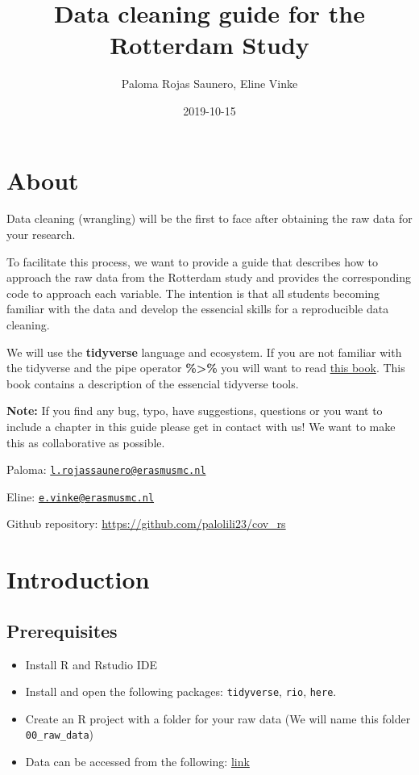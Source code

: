 \documentclass[]{book}
\title{Data cleaning guide for the Rotterdam Study}
\author{Paloma Rojas Saunero, Eline Vinke}
\date{2019-10-15}
\begin{document}
\maketitle

{
\setcounter{tocdepth}{1}
\tableofcontents
}
\hypertarget{about}{%
\chapter{About}\label{about}}

Data cleaning (wrangling) will be the first to face after obtaining the raw data for your research.

To facilitate this process, we want to provide a guide that describes how to approach the raw data from the Rotterdam study and provides the corresponding code to approach each variable. The intention is that all students becoming familiar with the data and develop the essencial skills for a reproducible data cleaning.

We will use the \textbf{tidyverse} language and ecosystem. If you are not familiar with the tidyverse and the pipe operator \textbf{\%\textgreater\%} you will want to read \href{https://r4ds.had.co.nz/pipes.html}{this book}. This book contains a description of the essencial tidyverse tools.

\textbf{Note:} If you find any bug, typo, have suggestions, questions or you want to include a chapter in this guide please get in contact with us! We want to make this as collaborative as possible.

Paloma: \href{mailto:l.rojassaunero@erasmusmc.nl}{\nolinkurl{l.rojassaunero@erasmusmc.nl}}

Eline: \href{mailto:e.vinke@erasmusmc.nl}{\nolinkurl{e.vinke@erasmusmc.nl}}

Github repository: \url{https://github.com/palolili23/cov_rs}

\hypertarget{intro}{%
\chapter{Introduction}\label{intro}}

\hypertarget{prerequisites}{%
\section{Prerequisites}\label{prerequisites}}

\begin{itemize}
\item
  Install R and Rstudio IDE
\item
  Install and open the following packages: \texttt{tidyverse}, \texttt{rio}, \texttt{here}.
\item
  Create an R project with a folder for your raw data (We will name this folder \texttt{00\_raw\_data})
\item
  Data can be accessed from the following: \href{https://epi-wiki.erasmusmc.nl/wiki/ergowiki/index.php/Ergobasics}{link}
\end{itemize}
\end{document}
